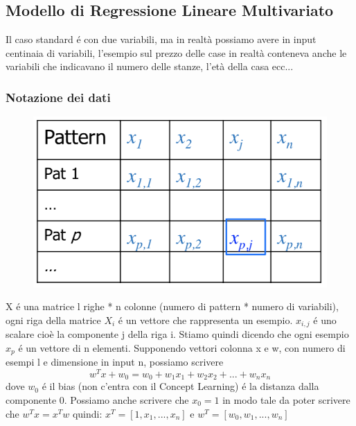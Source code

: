 \documentclass{article}
\begin{document}
\subsection{Modello di Regressione Lineare Multivariato}
Il caso standard é con due variabili, ma in realtà possiamo avere in input centinaia di variabili, l'esempio sul prezzo delle case in realtà conteneva anche le variabili che indicavano il numero delle stanze, l'età della casa ecc... 
\subsubsection{Notazione dei dati}
\begin{figure}[H]
    \centering
    \includegraphics[scale=0.6]{Images/datanotation.png}
\end{figure}
X é una matrice l righe * n colonne (numero di pattern * numero di variabili), ogni riga della matrice $X_i$ é un vettore che rappresenta un esempio. $x_{i,j}$ é uno scalare cioè la componente j della riga i. \newline
Stiamo quindi dicendo che ogni esempio $x_p$ é un vettore di n elementi. \newline
Supponendo vettori colonna x e w, con numero di esempi l e dimensione in input n, possiamo scrivere 
\begin{equation}
    w^Tx+w_0 = w_0+w_1x_1+w_2x_2+...+w_nx_n
\end{equation} 
dove $w_0$ é il bias (non c'entra con il Concept Learning) é la distanza dalla componente 0. Possiamo anche scrivere che $x_0=1$ in modo tale da poter scrivere che $w^Tx = x^Tw$ quindi: $x^T = [1,x_1,...,x_n]$ e $w^T = [w_0, w_1, ..., w_n]$
\end{document}
